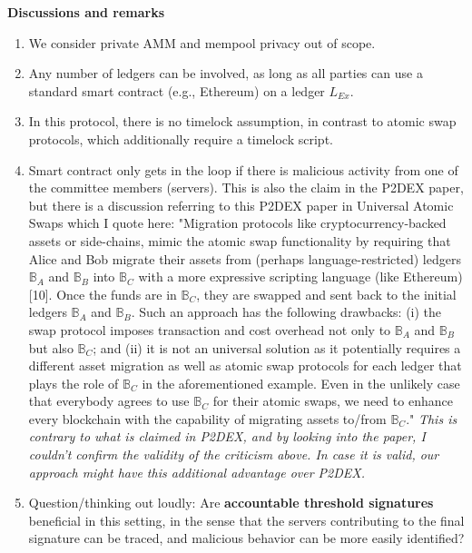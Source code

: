 \documentclass{article}
\begin{document}
\noindent \textbf{Discussions and remarks}
\begin{enumerate}
    \item {We consider private AMM and mempool privacy out of scope.}
    \item Any number of ledgers can be involved, as long as all parties can use a standard smart contract (e.g., Ethereum) on a ledger $L_{Ex}$.
    \item In this protocol, there is no timelock assumption, in contrast to atomic swap protocols, which additionally require a timelock script.
    \item Smart contract only gets in the loop if there is malicious activity from one of the committee members (servers). This is also the claim in the P2DEX paper, but there is a discussion referring to this P2DEX paper in Universal Atomic Swaps which I quote here: "Migration protocols like cryptocurrency-backed assets or side-chains, mimic the atomic swap functionality by requiring that Alice and Bob migrate their assets from (perhaps language-restricted) ledgers $\mathbb{B}_A$ and $\mathbb{B}_B$ into $\mathbb{B}_C$ with a more expressive scripting language (like Ethereum) [10]. Once the funds are in $\mathbb{B}_C$, they are swapped and sent back to the initial ledgers $\mathbb{B}_A$ and $\mathbb{B}_B$. Such an approach has the following drawbacks: (i) the swap protocol imposes transaction and cost overhead not only to $\mathbb{B}_A$ and $\mathbb{B}_B$ but also $\mathbb{B}_C$; and (ii) it is not an universal solution as it potentially requires a different asset migration as well as atomic swap protocols for each ledger that plays the role of $\mathbb{B}_C$ in the aforementioned example. Even in the unlikely case that everybody agrees to use $\mathbb{B}_C$ for their atomic swaps, we need to enhance every blockchain with the capability of migrating assets to/from $\mathbb{B}_C$."
    \textit{This is contrary to what is claimed in P2DEX, and by looking into the paper, I couldn't confirm the validity of the criticism above. In case it is valid, our approach might have this additional advantage over P2DEX.}
    \item Question/thinking out loudly: Are \textbf{accountable threshold signatures} beneficial in this setting, in the sense that the servers contributing to the final signature can be traced, and malicious behavior can be more easily identified?
\end{enumerate}
\end{document}
